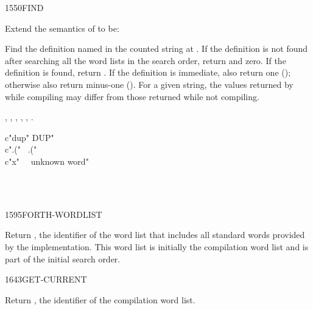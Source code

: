 \begin{worddef}{1550}{FIND}
\item Extend the semantics of  to be:


	Find the definition named in the counted string at .
	If the definition is not found after searching all the word lists
	in the search order, return  and zero. If
	the definition is found, return . If the definition is
	immediate, also return one (); otherwise also return
	minus-one (). For a given string, the values returned
	by  while compiling may differ from those returned
	while not compiling.

\see {},
	,
	,
	,
	,
	.

	\begin{testing}\ttfamily
		\word{:} c"dup"  DUP" \word{;} \\
		\word{:} c".("~  .("~ \word{;} \\
		\word{:} c"x"~~  unknown word" \word{;}

		 \\
		 \\
	\end{testing}
\end{worddef}


\begin{worddef}{1595}{FORTH-WORDLIST}
\item {}

	Return , the identifier of the word list that includes
	all standard words provided by the implementation. This word list
	is initially the compilation word list and is part of the initial
	search order.

	\begin{testing}
	\end{testing}
\end{worddef}


\begin{worddef}{1643}{GET-CURRENT}
\item {}

	Return , the identifier of the compilation word list.
\end{worddef}


